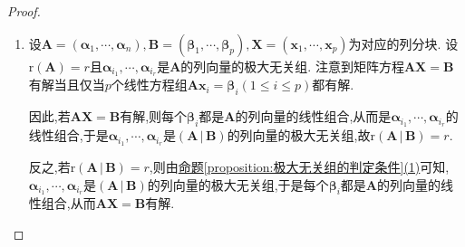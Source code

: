 \documentclass[../../main.tex]{subfiles}
\begin{document}
\begin{proof}
\begin{enumerate}
\item 设\(\boldsymbol{A}=(\boldsymbol{\alpha}_1,\cdots,\boldsymbol{\alpha}_n),\boldsymbol{B}=(\boldsymbol{\beta}_1,\cdots,\boldsymbol{\beta}_p),\boldsymbol{X}=(\boldsymbol{x}_1,\cdots,\boldsymbol{x}_p)\)为对应的列分块. 设\(\mathrm{r}(\boldsymbol{A}) = r\)且\(\boldsymbol{\alpha}_{i_1},\cdots,\boldsymbol{\alpha}_{i_r}\)是\(\boldsymbol{A}\)的列向量的极大无关组. 注意到矩阵方程\(\boldsymbol{A}\boldsymbol{X}=\boldsymbol{B}\)有解当且仅当\(p\)个线性方程组\(\boldsymbol{A}\boldsymbol{x}_i=\boldsymbol{\beta}_i(1\leqslant  i\leqslant  p)\)都有解. 

因此,若\(\boldsymbol{A}\boldsymbol{X}=\boldsymbol{B}\)有解,则每个\(\boldsymbol{\beta}_i\)都是\(\boldsymbol{A}\)的列向量的线性组合,从而是\(\boldsymbol{\alpha}_{i_1},\cdots,\boldsymbol{\alpha}_{i_r}\)的线性组合,于是\(\boldsymbol{\alpha}_{i_1},\cdots,\boldsymbol{\alpha}_{i_r}\)是\(\left( \boldsymbol{A}\,|\,\boldsymbol{B} \right)\)的列向量的极大无关组,故\(\mathrm{r}\left( \boldsymbol{A}\,|\,\boldsymbol{B} \right) = r\). 

反之,若\(\mathrm{r}\left( \boldsymbol{A}\,|\,\boldsymbol{B} \right) = r\),则由\hyperref[proposition:极大无关组的判定条件]{命题\ref{proposition:极大无关组的判定条件}(1)}可知,\(\boldsymbol{\alpha}_{i_1},\cdots,\boldsymbol{\alpha}_{i_r}\)是\(\left( \boldsymbol{A}\,|\,\boldsymbol{B} \right)\)的列向量的极大无关组,于是每个\(\boldsymbol{\beta}_i\)都是\(\boldsymbol{A}\)的列向量的线性组合,从而\(\boldsymbol{A}\boldsymbol{X}=\boldsymbol{B}\)有解.


\end{enumerate}
\end{proof}
\end{document}
